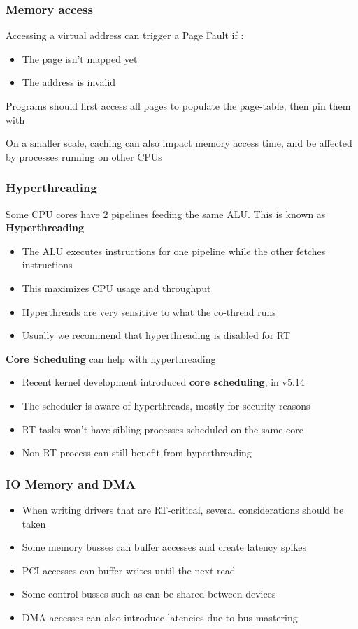 \begin{frame}
	\frametitle{Memory access}
	Accessing a virtual address can trigger a Page Fault if :
	\begin{itemize}
		\item The page isn't mapped yet
		\item The address is invalid
	\end{itemize}
	Programs should first access all pages to populate the page-table, then
	pin them with 

	On a smaller scale, caching can also impact memory access time, and be affected by
	processes running on other CPUs
\end{frame}

\begin{frame}
	\frametitle{Hyperthreading}
	Some CPU cores have 2 pipelines feeding the same ALU. This is known as \textbf{Hyperthreading}
	\begin{itemize}
		\item The ALU executes instructions for one pipeline while the other fetches instructions
		\item This maximizes CPU usage and throughput
		\item Hyperthreads are very sensitive to what the co-thread runs
		\item Usually we recommend that hyperthreading is disabled for RT
	\end{itemize}
	\textbf{Core Scheduling} can help with hyperthreading
	\begin{itemize}
		\item Recent kernel development introduced \textbf{core scheduling}, in v5.14
		\item The scheduler is aware of hyperthreads, mostly for security reasons
		\item RT tasks won't have sibling processes scheduled on the same core
		\item Non-RT process can still benefit from hyperthreading
	\end{itemize}
\end{frame}

\begin{frame}
	\frametitle{IO Memory and DMA}
	\begin{itemize}
		\item When writing drivers that are RT-critical, several considerations should be taken
		\item Some memory busses can buffer accesses and create latency spikes
		\item PCI accesses can buffer writes until the next read
		\item Some control busses such as  can be shared between devices
		\item DMA accesses can also introduce latencies due to bus mastering
	\end{itemize}
\end{frame}

